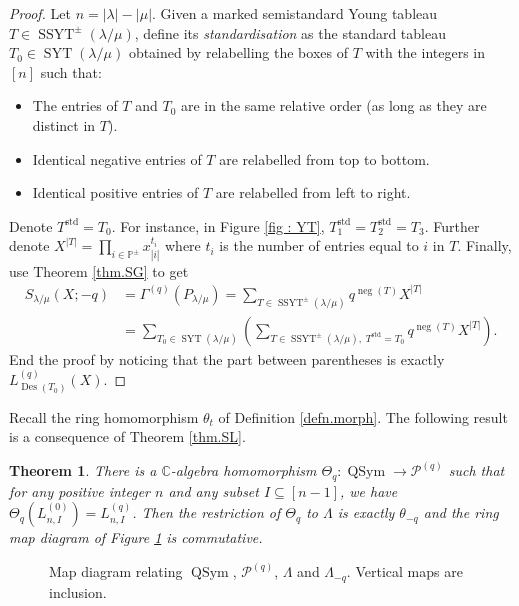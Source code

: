 \documentclass[revision]{FPSAC2024}
\newtheorem{theorem}{Theorem}
\newcommand{\la}{\lambda}
\newcommand{\CC}{\mathbb{C}} %
\newcommand{\PP}{\mathbb{P}} %
\newcommand{\QSym}{\operatorname{QSym}}
\newcommand{\SYT}{\operatorname{SYT}}
\newcommand{\SSYT}{\operatorname{SSYT}}
\newcommand{\std}{\operatorname{std}}
\newcommand{\nega}{\operatorname{neg}}
\newcommand{\Des}{\operatorname{Des}}
\begin{document}
\begin{proof}
Let $n = |\la|-|\mu|$. Given a marked semistandard Young tableau $T \in \SSYT^\pm(\la/\mu)$, define its \emph{standardisation} as the standard tableau $T_{0} \in \SYT(\la/\mu)$ obtained by relabelling the boxes of $T$ with the integers in $[n]$ such that: 
\begin{itemize}
\item The entries of $T$ and $T_{0}$ are in the same relative order (as long as they are distinct in $T$).
\item Identical negative entries of $T$ are relabelled from top to bottom.
\item Identical positive entries of $T$ are relabelled from left to right. 
\end{itemize}
Denote $T^{\std} = T_0$. For instance, in Figure \ref{fig : YT}, $T_1^{\std}= T_2^{\std} = T_3$. Further denote $X^{|T|} = \prod_{i \in \PP^\pm}x_{|i|}^{t_i}$ where $t_i$ is the number of entries equal to $i$ in $T$. Finally, use Theorem \ref{thm.SG} to get
\begin{align*}
S_{\la/\mu}(X;-q) &= \Gamma^{(q)}(P_{\la/\mu}) = \sum_{T \in \SSYT^\pm(\la/\mu)}q^{\nega(T)}X^{|T|}\\
&=\sum_{T_0 \in \SYT(\la/\mu)}\left (\sum_{T \in \SSYT^\pm(\la/\mu),\; T^{\std} = T_0}q^{\nega(T)}X^{|T|}\right).
\end{align*}
End the proof by noticing that the part between parentheses is exactly $L^{(q)}_{\Des(T_0)}(X)$.
\end{proof}
Recall the ring homomorphism $\theta_t$ of Definition \ref{defn.morph}. The following result is a consequence of Theorem \ref{thm.SL}. 
%
\begin{theorem}
\label{thm.theta}
There is a $\CC$-algebra homomorphism $\Theta_q : \QSym \longrightarrow \mathcal{P}^{(q)}$ such that for any positive integer $n$ and any subset $I\subseteq [n-1]$, we have $\Theta_q \left (L^{(0)}_{n, I} \right) = L^{(q)}_{n, I}$. Then the restriction of $\Theta_q$ to $\Lambda$ is exactly  $\theta_{-q}$ and the ring map diagram of Figure \ref{fig.ring_map} is commutative. 
\end{theorem}
\begin{figure}[htbp]
\begin{center}
\end{center}
\caption{Map diagram relating $\QSym$, $\mathcal{P}^{(q)}$, $\Lambda$ and $\Lambda_{-q}$. Vertical maps are inclusion.}
 \label{fig.ring_map}
 \end{figure}
\end{document}
